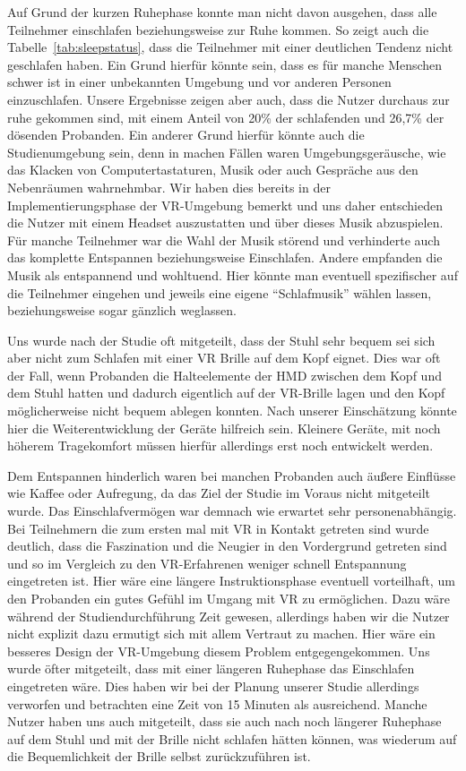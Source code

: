 Auf Grund der kurzen Ruhephase konnte man nicht davon ausgehen, dass alle Teilnehmer einschlafen beziehungsweise zur Ruhe kommen. So zeigt auch die Tabelle~\ref{tab:sleepstatus}, dass die Teilnehmer mit einer deutlichen Tendenz nicht geschlafen haben. 
Ein Grund hierfür könnte sein, dass es für manche Menschen schwer ist in einer unbekannten Umgebung und vor anderen Personen einzuschlafen. Unsere Ergebnisse zeigen aber auch, dass die Nutzer durchaus zur ruhe gekommen sind, mit einem Anteil von 20\% der schlafenden und 26,7\% der dösenden Probanden. 
Ein anderer Grund hierfür könnte auch die Studienumgebung sein, denn in machen Fällen waren Umgebungsgeräusche, wie das Klacken von Computertastaturen, Musik oder auch Gespräche aus den Nebenräumen wahrnehmbar. Wir haben dies bereits in der Implementierungsphase der VR-Umgebung bemerkt und uns daher entschieden die Nutzer mit einem Headset auszustatten und über dieses Musik abzuspielen.
Für manche Teilnehmer war die Wahl der Musik störend und verhinderte auch das komplette Entspannen beziehungsweise Einschlafen. 
Andere empfanden die Musik als entspannend und wohltuend. 
Hier könnte man eventuell spezifischer auf die Teilnehmer eingehen und jeweils eine eigene "`Schlafmusik"' wählen lassen, beziehungsweise sogar gänzlich weglassen.

Uns wurde nach der Studie oft mitgeteilt, dass der Stuhl sehr bequem sei sich aber nicht zum Schlafen mit einer VR Brille auf dem Kopf eignet. 
Dies war oft der Fall, wenn Probanden die Halteelemente der HMD zwischen dem Kopf und dem Stuhl hatten und dadurch eigentlich auf der VR-Brille lagen und den Kopf möglicherweise nicht bequem ablegen konnten. 
Nach unserer Einschätzung könnte hier die Weiterentwicklung der Geräte hilfreich sein. Kleinere Geräte, mit noch höherem Tragekomfort müssen hierfür allerdings erst noch entwickelt werden.

Dem Entspannen hinderlich waren bei manchen Probanden auch äußere Einflüsse wie Kaffee oder Aufregung, da das Ziel der Studie im Voraus nicht mitgeteilt wurde. Das Einschlafvermögen war demnach wie erwartet sehr personenabhängig.
Bei Teilnehmern die zum ersten mal mit VR in Kontakt getreten sind wurde deutlich, dass die Faszination und die Neugier in den Vordergrund getreten sind und so im Vergleich zu den VR-Erfahrenen weniger schnell Entspannung eingetreten ist. 
Hier wäre eine längere Instruktionsphase eventuell vorteilhaft, um den Probanden ein gutes Gefühl im Umgang mit VR zu ermöglichen. 
Dazu wäre während der Studiendurchführung Zeit gewesen, allerdings haben wir die Nutzer nicht explizit dazu ermutigt sich mit allem Vertraut zu machen. Hier wäre ein besseres Design der VR-Umgebung diesem Problem entgegengekommen.
Uns wurde öfter mitgeteilt, dass mit einer längeren Ruhephase das Einschlafen eingetreten wäre. Dies haben wir bei der Planung unserer Studie allerdings verworfen und betrachten eine Zeit von 15 Minuten als ausreichend.
Manche Nutzer haben uns auch mitgeteilt, dass sie auch nach noch längerer Ruhephase auf dem Stuhl und mit der Brille nicht schlafen hätten können, was wiederum auf die Bequemlichkeit der Brille selbst zurückzuführen ist.

